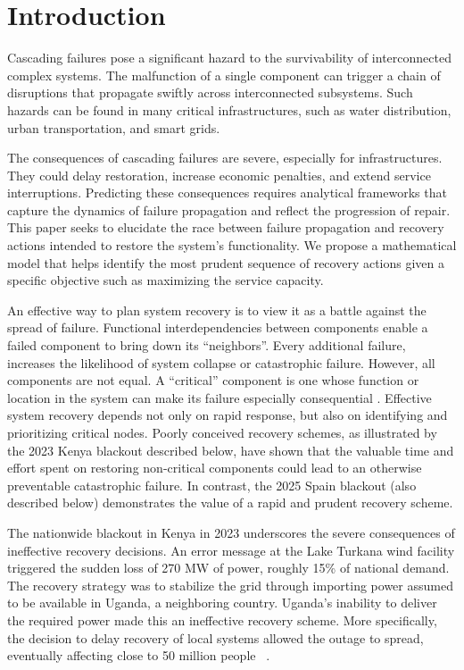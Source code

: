 \documentclass[conference]{IEEEtran}
\begin{document}
\section{Introduction}
Cascading failures pose a significant hazard to the survivability of interconnected complex systems. The malfunction of a single component can trigger a chain of disruptions that propagate swiftly across interconnected subsystems. Such hazards can be found in many critical infrastructures, such as water distribution, urban transportation, and smart grids.

The consequences of cascading failures are severe, especially for infrastructures. They could delay restoration, increase economic penalties, and extend service interruptions. Predicting these consequences requires analytical frameworks that capture the dynamics of failure propagation and reflect the progression of repair. This paper seeks to elucidate the race between failure propagation and recovery actions intended to restore the system's functionality. We propose a mathematical model that helps identify the most prudent sequence of recovery actions given a specific objective such as maximizing the service capacity.

An effective way to plan system recovery is to view it as a battle against the spread of failure. Functional interdependencies between components enable a failed component to bring down its ``neighbors''. Every additional failure, increases the likelihood of system collapse or catastrophic failure. However, all components are not equal. A ``critical'' component is one whose function or location in the system can make its failure especially consequential \cite{redacted}. Effective system recovery depends not only on rapid response, but also on identifying and prioritizing critical nodes. Poorly conceived recovery schemes, as illustrated by the 2023 Kenya blackout described below, have shown that the valuable time and effort spent on restoring non-critical components could lead to an otherwise preventable catastrophic failure. In contrast, the 2025 Spain blackout (also described below) demonstrates the value of a rapid and prudent recovery scheme.

The nationwide blackout in Kenya in 2023 underscores the severe consequences of ineffective recovery decisions. An error message at the Lake Turkana wind facility triggered the sudden loss of 270 MW of power, roughly 15\% of national demand. The recovery strategy was to stabilize the grid through importing power assumed to be available in Uganda, a neighboring country. Uganda's inability to deliver the required power made this an ineffective recovery scheme. More specifically, the decision to delay recovery of local systems allowed the outage to spread, eventually affecting close to 50 million people ~\cite{apkenya_aug23, apkenya_dec23, mwangi_kenya_2023}. 
\end{document}
